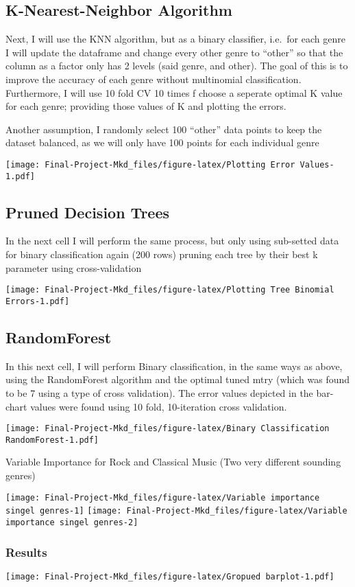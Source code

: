 \documentclass[
]{article}
\begin{document}
\hypertarget{k-nearest-neighbor-algorithm}{%
\subsection{K-Nearest-Neighbor
Algorithm}\label{k-nearest-neighbor-algorithm}}

Next, I will use the KNN algorithm, but as a binary classifier, i.e.~for
each genre I will update the dataframe and change every other genre to
``other'' so that the column as a factor only has 2 levels (said genre,
and other). The goal of this is to improve the accuracy of each genre
without multinomial classification. Furthermore, I will use 10 fold CV
10 times f choose a seperate optimal K value for each genre; providing
those values of K and plotting the errors.

Another assumption, I randomly select 100 ``other'' data points to keep
the dataset balanced, as we will only have 100 points for each
individual genre

\texttt{[image: Final-Project-Mkd\_files/figure-latex/Plotting Error Values-1.pdf]}

\hypertarget{pruned-decision-trees}{%
\subsection{Pruned Decision Trees}\label{pruned-decision-trees}}

In the next cell I will perform the same process, but only using
sub-setted data for binary classification again (200 rows) pruning each
tree by their best k parameter using cross-validation

\texttt{[image: Final-Project-Mkd\_files/figure-latex/Plotting Tree Binomial Errors-1.pdf]}

\hypertarget{randomforest}{%
\subsection{RandomForest}\label{randomforest}}

In this next cell, I will perform Binary classification, in the same
ways as above, using the RandomForest algorithm and the optimal tuned
mtry (which was found to be 7 using a type of cross validation). The
error values depicted in the bar-chart values were found using 10 fold,
10-iteration cross validation.

\texttt{[image: Final-Project-Mkd\_files/figure-latex/Binary Classification RandomForest-1.pdf]}

Variable Importance for Rock and Classical Music (Two very different
sounding genres)

\texttt{[image: Final-Project-Mkd\_files/figure-latex/Variable importance singel genres-1]}
\texttt{[image: Final-Project-Mkd\_files/figure-latex/Variable importance singel genres-2]}

\hypertarget{results}{%
\subsubsection{Results}\label{results}}

\texttt{[image: Final-Project-Mkd\_files/figure-latex/Gropued barplot-1.pdf]}
\end{document}
